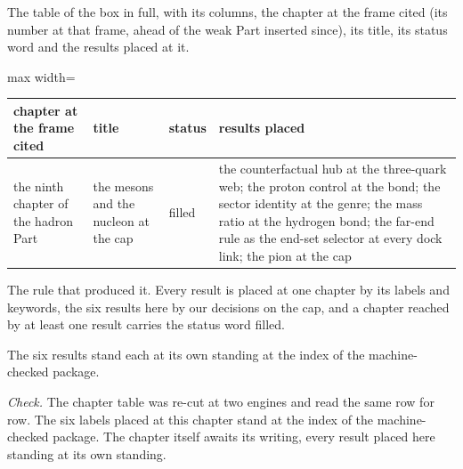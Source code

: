 \begin{chproof}[instrument]
The table of the box in full, with its columns, the chapter at the frame cited (its number at that frame, ahead of the weak Part inserted since), its title, its status word and the results placed at it.
\begin{center}\small
\begin{adjustbox}{max width=\linewidth}\begin{tabular}{llll}
\hline
chapter at the frame cited & title & status & results placed \\
\hline
the ninth chapter of the hadron Part & the mesons and the nucleon at the cap & filled & the counterfactual hub at the three-quark web; the proton control at the bond; the sector identity at the genre; the mass ratio at the hydrogen bond; the far-end rule as the end-set selector at every dock link; the pion at the cap \\
\hline
\end{tabular}\end{adjustbox}
\end{center}
The rule that produced it. Every result is placed at one chapter by its labels and keywords, the six results here by our decisions on the cap, and a chapter reached by at least one result carries the status word filled.

The six results stand each at its own standing at the index of the machine-checked package.

\emph{Check.} The chapter table was re-cut at two engines and read the same row for row. The six labels placed at this chapter stand at the index of the machine-checked package.
The chapter itself awaits its writing, every result placed here standing at its own standing.
\end{chproof}
\label{chend:VII-9-mesons-and-the-nucleon-at-the-cap}


